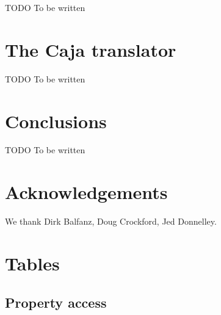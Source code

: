 \documentclass[letterpaper,twocolumn,10pt]{article}
\begin{document}
TODO To be written

\section{The Caja translator}

TODO To be written

\section{Conclusions}

TODO To be written

\section{Acknowledgements}

We thank 
Dirk Balfanz,
Doug Crockford,
Jed Donnelley.

\appendix

\section{Tables}

\subsection{Property access}
\end{document}
